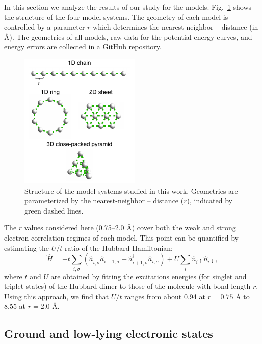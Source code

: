 \documentclass[aip,jcp,amsmath,amssymb, reprint]{revtex4-1}
\begin{document}
In this section we analyze the results of our study for the  models. 
Fig.~\ref{fig:systems} shows the structure of the four  model systems. 
The geometry of each model is controlled by a parameter $r$ which determines the nearest neighbor --  distance (in {\AA}).
The geometries of all models, raw data for the potential energy curves, and energy errors are collected in a GitHub repository.\cite{HstudyRepo2020}

\begin{figure}[bt!]
\centering
\includegraphics[width=2.25in]{figure_1.pdf}
\caption{Structure of the  model systems studied in this work. Geometries are parameterized by the nearest-neighbor -- distance ($r$), indicated by green dashed lines.}
\label{fig:systems}
\end{figure}

The $r$ values considered here (0.75--2.0 {\AA}) cover both the weak and strong electron correlation regimes of each model.
This point can be quantified by estimating the $U/t$ ratio of the Hubbard Hamiltonian:
\begin{equation}
\hat {H} =-t\sum _{i,\sigma }\left({\hat {a}}_{i,\sigma }^{\dagger }{\hat {a}}_{i+1,\sigma }+{\hat {a}}_{i+1,\sigma }^{\dagger }{\hat {a}}_{i,\sigma }\right)+U\sum _{i}{\hat {n}}_{i\uparrow }{\hat {n}}_{i\downarrow },
\end{equation}
where $t$ and $U$ are obtained by fitting the excitations energies (for singlet and triplet states) of the Hubbard dimer to those of the  molecule with bond length $r$.
Using this approach, we find that $U/t$ ranges from about 0.94 at $r = 0.75$ {\AA} to 8.55 at $r = 2.0$ {\AA}.

\subsection{\label{sec:low_lying_states}Ground and low-lying electronic states}
\end{document}

